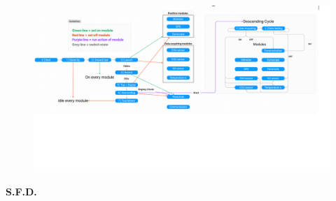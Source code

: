 \documentclass[11pt]{article}
\begin{document}
\begin{enumerate}
\begin{figure}[h]
\includegraphics[width=19cm]{Software Diagram.png}
\centering
\end{figure}
\end{enumerate}
\begin{center}
\vspace{-4.5cm}
\centering
\textbf{S.F.D.}
\end{center}
\end{document}
